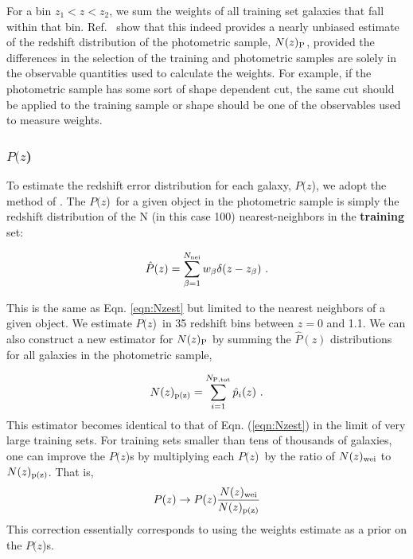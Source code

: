 \documentclass[preprint]{aastex}
\newcommand{\pofz}{$P(z$)}
\newcommand{\nwei}{N(z)_{\rm wei}}
\newcommand{\npz}{N(z)_{\rm p(z)}}
\begin{document}
\noindent For a bin $z_1 < z < z_2$, we sum the weights of all training
set galaxies that fall within that bin.  
Ref.~\cite{LimaPhotoz08,CunhaPhotoz09} show that this indeed provides
a nearly unbiased estimate of the redshift distribution of the photometric
sample, $N(z)_{\rm P}$, provided the differences in the selection of the
training and photometric samples are solely in the observable quantities used
to calculate the weights.  For example, if the photometric sample
has some sort of shape dependent cut, the same cut should be applied to the
training sample or shape should be one of the observables used to measure
weights.


\subsubsection{\pofz}

To estimate the redshift error distribution for each galaxy, \pofz,
we adopt the method of \cite{CunhaPhotoz09}. The \pofz\ for a given object in the
photometric sample is simply the redshift distribution of the N (in this case
100) nearest-neighbors in the {\bf training} set:

\begin{equation}
\hat{P}(z) = \sum_{\beta=1}^{N_{\rm nei}} w_\beta \delta(z-z_\beta)~.
\label{eqn:pzest}
\end{equation}

\noindent This is the same as Eqn. \ref{eqn:Nzest} but limited to the nearest
neighbors of a given object. We estimate \pofz\ in 35 redshift bins between
$z=0$ and 1.1.  We can also construct a new estimator for $N(z)_{\rm P}$ by
summing the $\hat{P}(z)$ distributions for all galaxies in the photometric
sample,


\begin{equation}
\npz = \sum_{i=1}^{N_{\rm P,tot}}\hat{p}_i(z)~.
\label{eqn:Nhat2}
\end{equation}
\noindent This estimator becomes identical to that of Eqn. (\ref{eqn:Nzest})
in the limit of very large training sets.  For training sets smaller than tens
of thousands of galaxies, one can improve the \pofz s by multiplying each \pofz\ by the
ratio of $\nwei$ to $\npz$.
That is,
\begin{equation}
P(z) \rightarrow P(z)\frac{\nwei}{\npz} \label{eqn:pzcorrect}
\end{equation}
This correction essentially corresponds to using the weights estimate as a
prior on the \pofz s.
\end{document}
